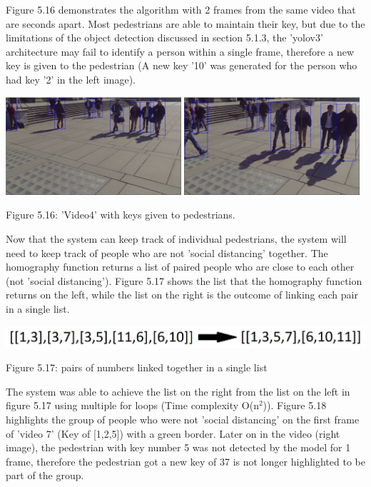 \documentclass[12pt]{report}
\begin{document}
Figure 5.16 demonstrates the algorithm with 2 frames from the same video that are seconds apart. Most pedestrians are able to maintain their key, but due to the limitations of the object detection discussed in section 5.1.3, the 'yolov3' architecture may fail to identify a person within a single frame, therefore a new key is given to the pedestrian (A new key '10' was generated for the person who had key '2' in the left image).

\begin{center}
	\includegraphics[width=65mm]{./images/appendix/Key1.JPG}
	\includegraphics[width=65mm]{./images/appendix/Key2.JPG}
	
	{\footnotesize Figure 5.16: 'Video4' with keys given to pedestrians.}
\end{center}

Now that the system can keep track of individual pedestrians, the system will need to keep track of people who are not 'social distancing' together. The homography function returns a list of paired people who are close to each other (not 'social distancing'). Figure 5.17 shows the list that the homography function returns on the left, while the list on the right is the outcome of linking each pair in a single list. 

\begin{center}
	\includegraphics[width=150mm]{./images/appendix/Linked.JPG}
	
	{\footnotesize Figure 5.17: pairs of numbers linked together in a single list}
\end{center}

The system was able to achieve the list on the right from the list on the left in figure 5.17 using multiple for loops (Time complexity O(n$^2$)). Figure 5.18 highlights the group of people who were not 'social distancing' on the first frame of 'video 7' (Key of [1,2,5]) with a green border. Later on in the video (right image), the pedestrian with key number 5 was not detected by the model for 1 frame, therefore the pedestrian got a new key of 37 is not longer highlighted to be part of the group.
\end{document}
